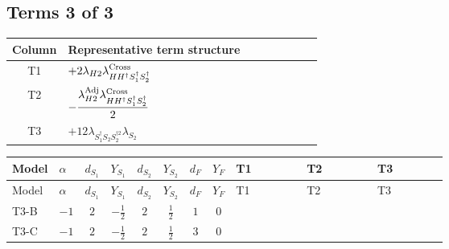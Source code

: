 \documentclass[8pt]{article}
\begin{document}
\begin{landscape}
\subsection*{Terms 3 of 3}
\begin{center}
\begin{tabular}{@{}c >{\raggedright\arraybackslash}p{0.82\linewidth}@{}}
\toprule
Column & Representative term structure \\
\midrule
T1 & \(\displaystyle +2 {\lambda_{H2}} {\lambda_{H H^\dagger S_1^\dagger S_2^\dagger}^{\rm Cross}}\) \\
\midrule
T2 & \(\displaystyle -\frac{{\lambda_{H2}^{\rm Adj}} {\lambda_{H H^\dagger S_1^\dagger S_2^\dagger}^{\rm Cross}}}{2}\) \\
\midrule
T3 & \(\displaystyle +12 {\lambda_{S_1^\dagger S_2 S_2^{\dagger 2}}} {\lambda_{S_2}}\) \\
\midrule
\bottomrule
\end{tabular}
\end{center}
\smallskip
\tiny
\begin{longtable}{@{}llcccccc >{\raggedright\arraybackslash}p{0.21\linewidth} >{\raggedright\arraybackslash}p{0.21\linewidth} >{\raggedright\arraybackslash}p{0.21\linewidth}@{}}
\toprule
Model & $\alpha$ & $d_{S_1}$ & $Y_{S_1}$ & $d_{S_2}$ & $Y_{S_2}$ & $d_F$ & $Y_F$ & T1 & T2 & T3 \\
\midrule
\endfirsthead
\toprule
Model & $\alpha$ & $d_{S_1}$ & $Y_{S_1}$ & $d_{S_2}$ & $Y_{S_2}$ & $d_F$ & $Y_F$ & T1 & T2 & T3 \\
\midrule
\endhead
T3-B & $-1$ & $2$ & $-\frac{1}{2}$ & $2$ & $\frac{1}{2}$ & $1$ & $0$ & \scriptsize\adjustbox{max width=\linewidth}{$\begin{gathered} +2 {\lambda_{H2}} {\lambda_{H H^\dagger S_1^\dagger S_2^\dagger}^{\rm Cross}}\end{gathered}$} & \scriptsize\adjustbox{max width=\linewidth}{$\begin{gathered} -\frac{{\lambda_{H2}^{\rm Adj}} {\lambda_{H H^\dagger S_1^\dagger S_2^\dagger}^{\rm Cross}}}{2}\end{gathered}$} & \scriptsize\adjustbox{max width=\linewidth}{$\begin{gathered} +12 {\lambda_{S_1^\dagger S_2 S_2^{\dagger 2}}} {\lambda_{S_2}}\end{gathered}$} \\
\midrule
T3-C & $-1$ & $2$ & $-\frac{1}{2}$ & $2$ & $\frac{1}{2}$ & $3$ & $0$ & \scriptsize\adjustbox{max width=\linewidth}{$\begin{gathered} +2 {\lambda_{H2}} {\lambda_{H H^\dagger S_1^\dagger S_2^\dagger}^{\rm Cross}}\end{gathered}$} & \scriptsize\adjustbox{max width=\linewidth}{$\begin{gathered} -\frac{{\lambda_{H2}^{\rm Adj}} {\lambda_{H H^\dagger S_1^\dagger S_2^\dagger}^{\rm Cross}}}{2}\end{gathered}$} & \scriptsize\adjustbox{max width=\linewidth}{$\begin{gathered} +12 {\lambda_{S_1^\dagger S_2 S_2^{\dagger 2}}} {\lambda_{S_2}}\end{gathered}$} \\

\end{longtable}
\end{landscape}
\end{document}
